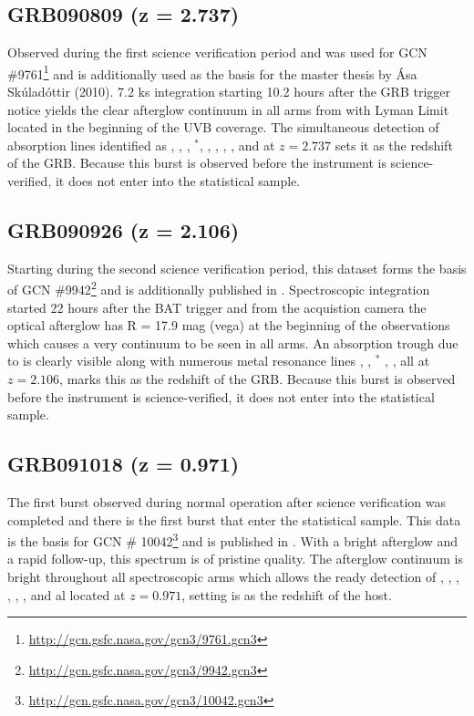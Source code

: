 \documentclass{aa}    %
\begin{document}
\subsection{GRB090809 (z = 2.737)}
Observed during the first science verification period and was used for GCN
\#9761\footnote{\url{http://gcn.gsfc.nasa.gov/gcn3/9761.gcn3}} and is
additionally used as the basis for the master thesis by \'Asa Sk\'ulad\'ottir
(2010). 7.2 ks integration starting 10.2 hours after the GRB trigger notice
yields the clear afterglow continuum in all arms from with Lyman Limit located
in the beginning of the UVB coverage. The simultaneous detection of absorption
lines identified as \lya, \SIii, \oi, \SIi$^*$, \SIiv, \civ, \feii, \alii,
\aliii and \mgii at $z = 2.737$ sets it as the redshift of the GRB. Because this burst is observed before the instrument is
science-verified, it does not enter into the statistical sample.

\subsection{GRB090926 (z = 2.106)}
Starting during the second science verification period, this dataset forms the
basis of GCN \#9942\footnote{\url{http://gcn.gsfc.nasa.gov/gcn3/9942.gcn3}} and
is additionally published in \citet{DElia2010}. Spectroscopic integration
started 22 hours after the BAT trigger and from the acquistion camera the
optical afterglow has R = 17.9 mag (vega) at the beginning of the observations
which causes a very continuum to be seen in all arms. An absorption trough due
to \lya is clearly visible along with numerous metal resonance lines \civ,
\SIii, \SIii$^*$ \feii, \mgii, all at $z = 2.106$, marks this as the redshift of
the GRB. Because this burst is observed before the instrument is
science-verified, it does not enter into the statistical sample.

\subsection{GRB091018 (z = 0.971)}
The first burst observed during normal operation after science verification was
completed and there is the first burst that enter the statistical sample. This
data is the basis for GCN \#
10042\footnote{\url{http://gcn.gsfc.nasa.gov/gcn3/10042.gcn3}} and is published
in \citet{Wiersema2012}. With a bright afterglow and a rapid follow-up, this
spectrum is of pristine quality. The afterglow continuum is bright throughout
all spectroscopic arms which allows the ready detection of \alii, \aliii, \feii,
\mnii, \mgii, \mgi, and \caii al located at $z = 0.971$, setting is as the
redshift of the host.
\end{document}
